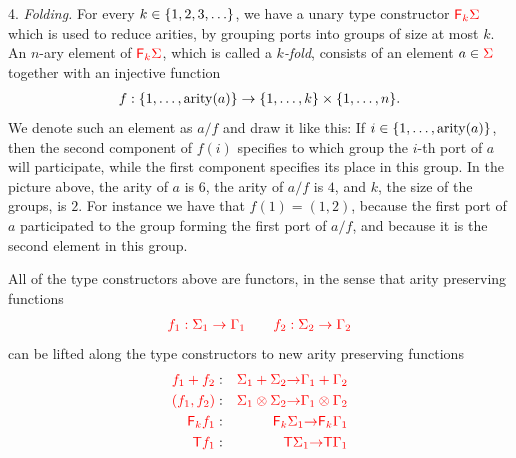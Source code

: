 \begin{definition}[Types]
     4. \emph{Folding.} For every $k \in \{1,2,3,\ldots\}$, we have a unary type constructor ${\color{red}{\mathsf F_{k}}}{\color{red}{\Sigma}}$  which is used to reduce arities, by grouping ports into groups of size at most $k$.  An $n$-ary element of ${\color{red}{\mathsf F_{k}}}{\color{red}{\Sigma}}$, which is called a \emph{$k$-fold}, consists of an element      $a \in {\color{red}{\Sigma}}$  together with an  injective  function
            \begin{align*}
                f : \{1,\ldots,\mathrm{arity}(a)\} \to \{1,\ldots,k\} \times  \{1,\ldots,n\}.
            \end{align*}
            We denote such an element as $a/f$ and draw it like this: 
            If $i\in  \{1,\ldots,\mathrm{arity}(a)\}$, then the second component of $f(i)$ specifies to which group the $i$-th port of $a$ will participate, while the first component specifies its place in this group. In the picture above, the arity of $a$ is $6$, the arity of $a/f$ is $4$, and $k$, the size of the groups,  is $2$. For instance we have that $f(1)=(1,2)$, because the first port of $a$ participated to the group forming the first port of $a/f$, and because it is the second element in this group.
    \smallskip
                    
\end{definition}


\newcommand{\funcitem}[3]{\ranked{#1  } &:& \ranked{#2} \rto  \ranked{#3}}
All of the type constructors  above are functors, in the sense  that  arity preserving functions
\begin{align*}
{\color{red}{f_1 : \Sigma_1 \to \Gamma_1 \qquad f_2 : \Sigma_2 \to \Gamma_2}}
\end{align*}       
can be lifted along the type constructors to new arity preserving  functions
\begin{eqnarray}
\label{eq:liftplus}\funcitem{f_1 + f_2}{\Sigma_1 + \Sigma_2}{\Gamma_1 + \Gamma_2} \\
\funcitem{(f_1,f_2)}{\Sigma_1 \otimes \Sigma_2}{\Gamma_1 \otimes \Gamma_2}\\
\funcitem{\reduce k f_1}{\reduce k \Sigma_1}{\reduce k \Gamma_1}\\
\funcitem{\tmonad f_1}{\tmonad \Sigma_1}{\tmonad \Gamma_1}
\end{eqnarray}

